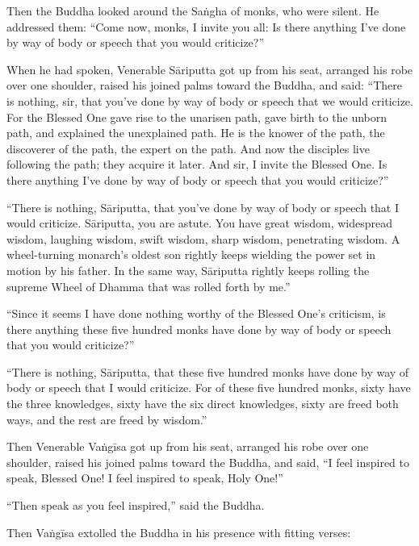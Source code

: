 \documentclass[12pt,openany]{book}%
\begin{document}
Then the Buddha looked around the \textsanskrit{Saṅgha} of monks, who were silent. He addressed them: “Come now, monks, I invite you all: Is there anything I’ve done by way of body or speech that you would criticize?” 

When he had spoken, Venerable \textsanskrit{Sāriputta} got up from his seat, arranged his robe over one shoulder, raised his joined palms toward the Buddha, and said: “There is nothing, sir, that you’ve done by way of body or speech that we would criticize. For the Blessed One gave rise to the unarisen path, gave birth to the unborn path, and explained the unexplained path. He is the knower of the path, the discoverer of the path, the expert on the path. And now the disciples live following the path; they acquire it later. And sir, I invite the Blessed One. Is there anything I’ve done by way of body or speech that you would criticize?” 

“There is nothing, \textsanskrit{Sāriputta}, that you’ve done by way of body or speech that I would criticize. \textsanskrit{Sāriputta}, you are astute. You have great wisdom, widespread wisdom, laughing wisdom, swift wisdom, sharp wisdom, penetrating wisdom. A wheel-turning monarch’s oldest son rightly keeps wielding the power set in motion by his father. In the same way, \textsanskrit{Sāriputta} rightly keeps rolling the supreme Wheel of Dhamma that was rolled forth by me.” 

“Since it seems I have done nothing worthy of the Blessed One’s criticism, is there anything these five hundred monks have done by way of body or speech that you would criticize?” 

“There is nothing, \textsanskrit{Sāriputta}, that these five hundred monks have done by way of body or speech that I would criticize. For of these five hundred monks, sixty have the three knowledges, sixty have the six direct knowledges, sixty are freed both ways, and the rest are freed by wisdom.” 

Then Venerable \textsanskrit{Vaṅgīsa} got up from his seat, arranged his robe over one shoulder, raised his joined palms toward the Buddha, and said, “I feel inspired to speak, Blessed One! I feel inspired to speak, Holy One!” 

“Then speak as you feel inspired,” said the Buddha. 

Then \textsanskrit{Vaṅgīsa} extolled the Buddha in his presence with fitting verses: 
\end{document}
